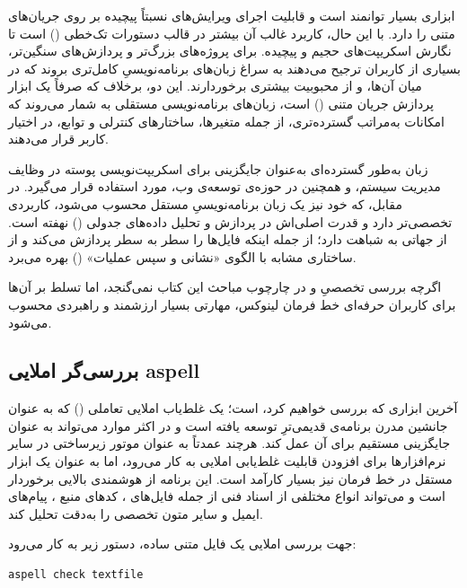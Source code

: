  ابزاری بسیار توانمند است و قابلیت اجرای ویرایش‌های نسبتاً پیچیده بر روی جریان‌های متنی را دارد. با این حال، کاربرد غالب آن بیشتر در قالب دستورات تک‌خطی () است تا نگارش اسکریپت‌های حجیم و پیچیده. برای پروژه‌های بزرگ‌تر و پردازش‌های سنگین‌تر، بسیاری از کاربران ترجیح می‌دهند به سراغ زبان‌های برنامه‌نویسیِ کامل‌تری بروند که در میان آن‌ها،  و  از محبوبیت بیشتری برخوردارند. این دو، برخلاف  که صرفاً یک ابزار پردازش جریان متنی () است، زبان‌های برنامه‌نویسی مستقلی به شمار می‌روند که امکانات به‌مراتب گسترده‌تری، از جمله متغیرها، ساختارهای کنترلی و توابع، در اختیار کاربر قرار می‌دهند.

زبان  به‌طور گسترده‌ای به‌عنوان جایگزینی برای اسکریپت‌نویسی پوسته در وظایف مدیریت سیستم، و همچنین در حوزه‌ی توسعه‌ی وب، مورد استفاده قرار می‌گیرد. در مقابل،  که خود نیز یک زبان برنامه‌نویسیِ مستقل محسوب می‌شود، کاربردی تخصصی‌تر دارد و قدرت اصلی‌اش در پردازش و تحلیل داده‌های جدولی () نهفته است.  از جهاتی به  شباهت دارد؛ از جمله اینکه فایل‌ها را سطر به سطر پردازش می‌کند و از ساختاری مشابه با الگوی «نشانی و سپس عملیات» () بهره می‌برد.

اگرچه بررسی تخصصیِ  و  در چارچوب مباحث این کتاب نمی‌گنجد، اما تسلط بر آن‌ها برای کاربران حرفه‌ای خط فرمان لینوکس، مهارتی بسیار ارزشمند و راهبردی محسوب می‌شود.

\subsection{بررسی‌گر املایی aspell}

آخرین ابزاری که بررسی خواهیم کرد،  است؛ یک غلط‌یاب املایی تعاملی () که به عنوان جانشین مدرن برنامه‌ی قدیمی‌ترِ  توسعه یافته است و در اکثر موارد می‌تواند به عنوان جایگزینی مستقیم برای آن عمل کند. هرچند  عمدتاً به عنوان موتور زیرساختی در سایر نرم‌افزارها برای افزودن قابلیت غلط‌یابی املایی به کار می‌رود، اما به عنوان یک ابزار مستقل در خط فرمان نیز بسیار کارآمد است. این برنامه از هوشمندی بالایی برخوردار است و می‌تواند انواع مختلفی از اسناد فنی از جمله فایل‌های ، کدهای منبع ، پیام‌های ایمیل و سایر متون تخصصی را به‌دقت تحلیل کند.

جهت بررسی املایی یک فایل متنی ساده، دستور زیر به کار می‌رود:

\begin{latin}
\begin{lstlisting}
aspell check textfile
\end{lstlisting}
\end{latin}

